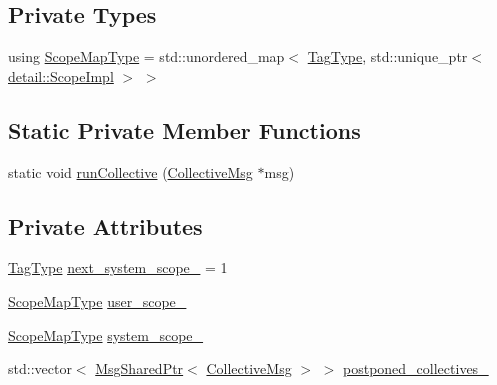 \subsection*{Private Types}
\begin{DoxyCompactItemize}
\item 
using \hyperlink{structvt_1_1collective_1_1_collective_alg_abf644b20fe35cf654f5d4a6702ef5183}{Scope\+Map\+Type} = std\+::unordered\+\_\+map$<$ \hyperlink{namespacevt_a84ab281dae04a52a4b243d6bf62d0e52}{Tag\+Type}, std\+::unique\+\_\+ptr$<$ \hyperlink{structvt_1_1collective_1_1detail_1_1_scope_impl}{detail\+::\+Scope\+Impl} $>$ $>$
\end{DoxyCompactItemize}
\subsection*{Static Private Member Functions}
\begin{DoxyCompactItemize}
\item 
static void \hyperlink{structvt_1_1collective_1_1_collective_alg_a9ed7397e91a18458c3a578be3605baa9}{run\+Collective} (\hyperlink{structvt_1_1collective_1_1_collective_alg_1_1_collective_msg}{Collective\+Msg} $\ast$msg)
\end{DoxyCompactItemize}
\subsection*{Private Attributes}
\begin{DoxyCompactItemize}
\item 
\hyperlink{namespacevt_a84ab281dae04a52a4b243d6bf62d0e52}{Tag\+Type} \hyperlink{structvt_1_1collective_1_1_collective_alg_ad830a204e2989b28cc90d54e83f518b5}{next\+\_\+system\+\_\+scope\+\_\+} = 1
\item 
\hyperlink{structvt_1_1collective_1_1_collective_alg_abf644b20fe35cf654f5d4a6702ef5183}{Scope\+Map\+Type} \hyperlink{structvt_1_1collective_1_1_collective_alg_a72bb12e5bbe0c52e867c81e76db318d9}{user\+\_\+scope\+\_\+}
\item 
\hyperlink{structvt_1_1collective_1_1_collective_alg_abf644b20fe35cf654f5d4a6702ef5183}{Scope\+Map\+Type} \hyperlink{structvt_1_1collective_1_1_collective_alg_a947ce4f129e1cf626da031595fe5df5c}{system\+\_\+scope\+\_\+}
\item 
std\+::vector$<$ \hyperlink{namespacevt_ab2b3d506ec8e8d1540aede826d84a239}{Msg\+Shared\+Ptr}$<$ \hyperlink{structvt_1_1collective_1_1_collective_alg_1_1_collective_msg}{Collective\+Msg} $>$ $>$ \hyperlink{structvt_1_1collective_1_1_collective_alg_ac6db64bfd14e19d0a31f69a349a452c5}{postponed\+\_\+collectives\+\_\+}
\end{DoxyCompactItemize}
